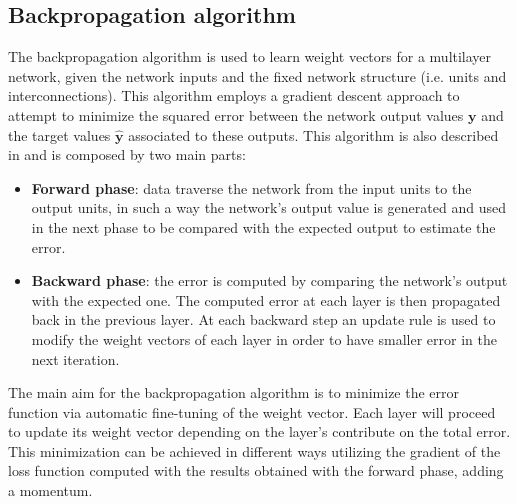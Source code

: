\subsection{Backpropagation algorithm}
The backpropagation algorithm \parencite[see][chapter 4]{haykin_neural_2009} is used to learn weight vectors for a multilayer network, given the network inputs and the fixed network structure (i.e. units and interconnections). This algorithm employs a gradient descent approach to attempt to minimize the squared error between the network output values $\textbf{y}$ and the target values $\hat{\textbf{y}}$ associated to these outputs. This algorithm is also described in \cite{MLmitchell} and is composed by two main parts:
\begin{itemize}
    \item \textbf{Forward phase}: data traverse the network from the input units to the output units, in such a way the network's output value is generated and used in the next phase to be compared with the expected output to estimate the error.
    \item \textbf{Backward phase}: the error is computed by comparing the network's output with the expected one. The computed error at each layer is then propagated back in the previous layer. At each backward step an update rule is used to modify the weight vectors of each layer in order to have smaller error in the next iteration.
\end{itemize}
The main aim for the backpropagation algorithm is to minimize the error function via automatic fine-tuning of the weight vector. Each layer will proceed to update its weight vector depending on the layer's contribute on the total error. This minimization can be achieved in different ways utilizing the gradient of the loss function computed with the results obtained with the forward phase, adding a momentum.\newline
{}

